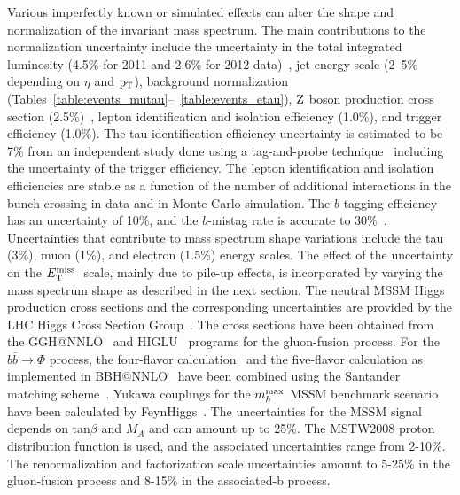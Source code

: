 Various imperfectly known or simulated effects can alter the shape and 
normalization of the invariant mass spectrum. The main contributions to 
the normalization uncertainty include the uncertainty in the total integrated 
luminosity (4.5\% for 2011 and 2.6\% for 2012 data)~\cite{CMS-LUMI}, jet 
energy scale (2--5\% depending on $\eta$ and $\mathrm{p_{T}}$)\cite{cmsPFJetResolution}, background normalization
(Tables~\ref{table:events_mutau}--~\ref{table:events_etau}), $\mathrm{Z}$ boson 
production cross section (2.5\%)~\cite{CMS-EWK-WZ}, lepton identification and 
isolation efficiency (1.0\%), and trigger efficiency (1.0\%). The tau-identification 
efficiency uncertainty is estimated to be 7\% from an independent study done 
using a tag-and-probe technique~\cite{CMS-EWK-WZ} including the uncertainty 
of the trigger efficiency. The lepton identification and isolation efficiencies are stable 
as a function of the number of additional interactions in the bunch crossing in data 
and in Monte Carlo simulation. The $b$-tagging efficiency has an uncertainty of 
10\%, and the $b$-mistag rate is accurate to 30\%~\cite{BTV-11-004}. 
Uncertainties that contribute to mass spectrum shape variations include the 
tau (3\%), muon (1\%), and electron (1.5\%) energy scales\cite{TAU_En_Uncertainty,CMS-PAS-HIG-13-021}.
The effect of the uncertainty on the $E_\mathrm{T}^{\mathrm{miss}}\;$ scale, mainly due to pile-up effects, 
is incorporated by varying the mass spectrum shape as described in the next section.
The neutral MSSM Higgs production cross sections and the corresponding 
uncertainties are provided by the LHC Higgs Cross Section 
Group~\cite{LHCHiggsCrossSectionWorkingGroup:2011ti}. The cross sections have 
been obtained from the 
GGH@NNLO~\cite{Harlander:2002wh,Anastasiou:2002yz,Ravindran:2003um,Harlander:2002vv,Anastasiou:2002wq} and HIGLU~\cite{Spira:1995rr,Spira:1995mt} 
programs for the gluon-fusion process. For the $b\bar{b}\to\Phi$ process, 
the four-flavor calculation~\cite{Dittmaier:2003ej,Dawson:2003kb} and 
the five-flavor calculation as implemented in BBH@NNLO~\cite{Harlander:2003ai} 
have been combined using the Santander matching scheme~\cite{Santander}. 
Yukawa couplings for the $m_{h}^{\rm max}$ MSSM benchmark scenario have 
been calculated by FeynHiggs~\cite{Heinemeyer:1998yj,Heinemeyer:1998np,Degrassi:2002fi}.
The uncertainties for the MSSM signal depends on tan$\beta$ and $M_{A}$ and can 
amount up to 25\%. The MSTW2008 proton distribution function is used, and the 
associated uncertainties range from 2-10\%. The renormalization and factorization 
scale uncertainties amount to 5-25\% in the gluon-fusion process and 8-15\% in the associated-b process. 


